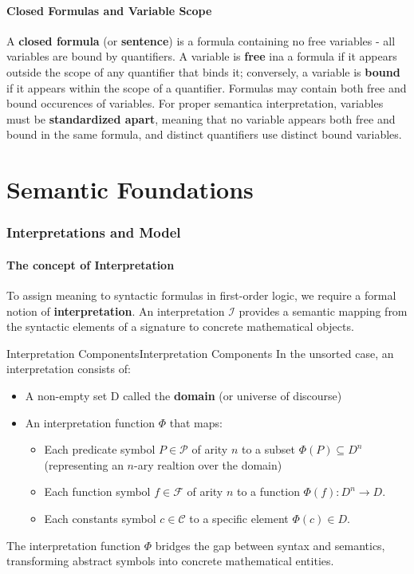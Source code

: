 \documentclass[a4paper]{article}
\theoremstyle{definition}
\begin{document}
\subsection{Closed Formulas and Variable Scope}
A \textbf{closed formula} (or \textbf{sentence}) is a formula containing no free variables - all variables are bound by 
quantifiers. A variable is \textbf{free} ina a formula if it appears outside the scope of any 
quantifier that binds it; conversely, a variable is \textbf{bound} if it appears within the scope of a quantifier.
\vspace{1em}
\noindent
\newline
Formulas may contain both free and bound occurences of variables. For proper semantica interpretation, variables must be
\textbf{standardized apart}, meaning that no variable appears both free and bound 
in the same formula, and distinct quantifiers use distinct bound variables.
\part{Semantic Foundations}
\section{Interpretations and Model}
\subsection{The concept of Interpretation}
To assign meaning to syntactic formulas in first-order logic, we require a formal notion of 
\textbf{interpretation}. An interpretation \( \mathcal{I} \) provides a semantic mapping from the syntactic elements 
of a signature to concrete mathematical objects.
\begin{definition}{Interpretation Components}{Interpretation Components}
In the unsorted case, an interpretation consists of:
\begin{itemize}
	\item A non-empty set D called the \textbf{domain} (or universe of discourse)
	\item An interpretation function \( \Phi \) that maps:
	\begin{itemize}
		\item Each predicate symbol \( P \in \mathcal{P} \) of arity \( n \) to a subset \( \Phi(P) \subseteq D^n \) (representing an \( n \)-ary realtion over the domain)
		\item Each function symbol \( f \in \mathcal{F} \) of arity \( n \) to a function \( \Phi(f) : D^n \rightarrow D \).
		\item Each constants symbol \( c \in \mathcal{C} \) to a specific element \( \Phi(c) \in D \).
 	\end{itemize}
\end{itemize}
\end{definition}
The interpretation function \( \Phi \) bridges the gap between syntax and semantics, transforming abstract symbols into concrete 
mathematical entities.
\end{document}

